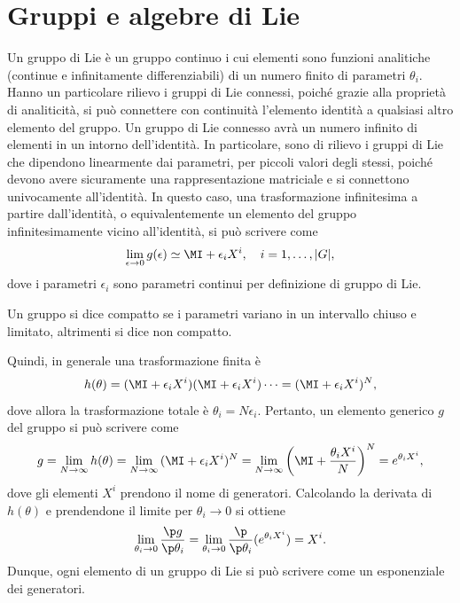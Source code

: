 \section{Gruppi e algebre di Lie}
Un gruppo di Lie è un gruppo continuo i cui elementi sono funzioni analitiche (continue e infinitamente differenziabili) di un numero finito di parametri $\theta_i$. Hanno un particolare rilievo i gruppi di Lie connessi, poiché grazie alla proprietà di analiticità, si può connettere con continuità l'elemento identità a qualsiasi altro elemento del gruppo. Un gruppo di Lie connesso avrà un numero infinito di elementi in un intorno dell'identità. In particolare, sono di rilievo i gruppi di Lie che dipendono linearmente dai parametri, per piccoli valori degli stessi, poiché devono avere sicuramente una rappresentazione matriciale e si connettono univocamente all'identità. In questo caso, una trasformazione infinitesima a partire dall'identità, o equivalentemente un elemento del gruppo infinitesimamente vicino all'identità, si può scrivere come
\begin{equation}
    \lim_{\epsilon\to0}{g(\epsilon)} \simeq \MI + \epsilon_i X^i,\quad i=1,\dots,|G|,
\end{equation}
dove i parametri $\epsilon_i$ sono parametri continui per definizione di gruppo di Lie.
\begin{defn}[compattezza]
    Un gruppo si dice compatto se i parametri variano in un intervallo chiuso e limitato, altrimenti si dice non compatto.
\end{defn}
Quindi, in generale una trasformazione finita è
\begin{equation}
\label{eq: trasformazione finita GdL}
    h(\theta) = (\MI +\epsilon_i X^i)(\MI +\epsilon_i X^i)\cdots = (\MI +\epsilon_i X^i)^N,
\end{equation}
dove allora la trasformazione totale è $\theta_i = N\epsilon_i$. Pertanto, un elemento generico $g$ del gruppo si può scrivere come
\begin{equation}
    g = \lim_{N\to\infty}{h(\theta)} = \lim_{N\to\infty}{(\MI + \epsilon_i X^i)^N} = \lim_{N\to\infty}{\bigg(\MI + \frac{\theta_iX^i}{N}\bigg)^N} = e^{\theta_i X^i},
\end{equation}
dove gli elementi $X^i$ prendono il nome di generatori. Calcolando la derivata di $h(\theta)$ e prendendone il limite per $\theta_i\to0$ si ottiene
\begin{equation}
    \lim_{\theta_i\to 0}{\frac{\p g}{\p\theta_i}} = \lim_{\theta_i\to 0}{\frac{\p}{\p\theta_i}(e^{\theta_i X^i})} = X^i.
\end{equation}
Dunque, ogni elemento di un gruppo di Lie si può scrivere come un esponenziale dei generatori. 

